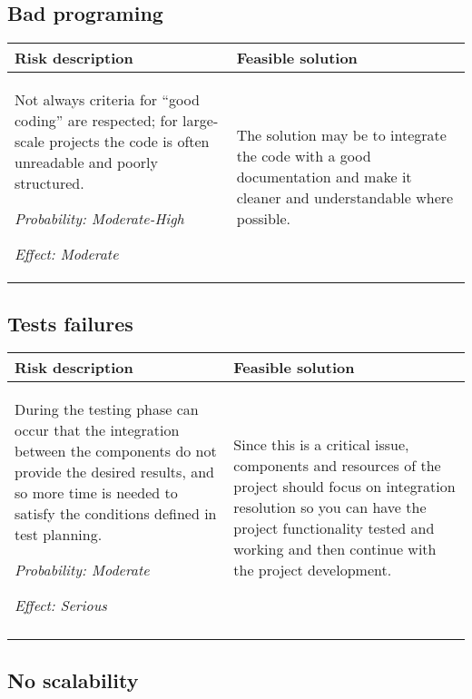 \documentclass{scrreprt}
\begin{document}
\subsection{Bad programing}


\begin{center}
\begin{tabularx}{\columnwidth}{XX}
\toprule \textbf{Risk description} & \textbf{Feasible solution}\\
\midrule
Not always criteria for “good coding” are respected; for large-scale projects the code is often unreadable and poorly structured.

\emph{Probability: Moderate-High } 

\emph{Effect: Moderate}& The solution may be to integrate the code with a good documentation and make it cleaner and understandable where possible.\\
\bottomrule
\end{tabularx}
\end{center}

\subsection{Tests failures}

\begin{center}
\begin{tabularx}{\columnwidth}{XX}
\toprule \textbf{Risk description} & \textbf{Feasible solution}\\
\midrule
 During the testing phase can occur that the integration between the components do not provide the desired results, and so more time is needed to satisfy the conditions defined in test planning.

\emph{Probability: Moderate } 

\emph{Effect: Serious}& Since this is a critical issue, components and resources of the project should focus on integration resolution so you can have the project functionality tested and working and then continue with the project development.\\
\midrule
& \\
\bottomrule
\end{tabularx}
\end{center}

\subsection{No scalability}
\end{document}
